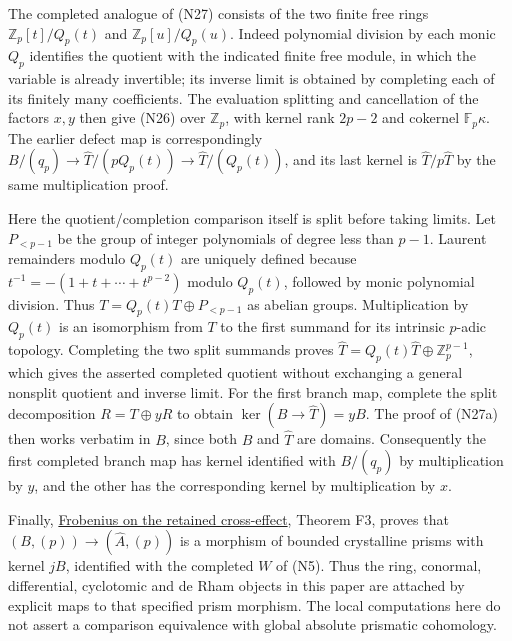\documentclass[
]{article}
\begin{document}
The completed analogue of (N27) consists of the two finite free rings
\(\mathbb Z_p[t]/Q_p(t)\) and \(\mathbb Z_p[u]/Q_p(u)\). Indeed
polynomial division by each monic \(Q_p\) identifies the quotient with
the indicated finite free module, in which the variable is already
invertible; its inverse limit is obtained by completing each of its
finitely many coefficients. The evaluation splitting and cancellation of
the factors \(x,y\) then give (N26) over \(\mathbb Z_p\), with kernel
rank \(2p-2\) and cokernel \(\mathbb F_p\kappa\). The earlier defect map
is correspondingly
\(B/(q_p)\to\widehat T/(pQ_p(t))\to\widehat T/(Q_p(t))\), and its last
kernel is \(\widehat T/p\widehat T\) by the same multiplication proof.

Here the quotient/completion comparison itself is split before taking
limits. Let \(P_{<p-1}\) be the group of integer polynomials of degree
less than \(p-1\). Laurent remainders modulo \(Q_p(t)\) are uniquely
defined because \(t^{-1}=-(1+t+\cdots+t^{p-2})\) modulo \(Q_p(t)\),
followed by monic polynomial division. Thus \(T=Q_p(t)T\oplus P_{<p-1}\)
as abelian groups. Multiplication by \(Q_p(t)\) is an isomorphism from
\(T\) to the first summand for its intrinsic \(p\)-adic topology.
Completing the two split summands proves
\(\widehat T=Q_p(t)\widehat T\oplus\mathbb Z_p^{p-1}\), which gives the
asserted completed quotient without exchanging a general nonsplit
quotient and inverse limit. For the first branch map, complete the split
decomposition \(R=T\oplus yR\) to obtain \(\ker(B\to\widehat T)=yB\).
The proof of (N27a) then works verbatim in \(B\), since both \(B\) and
\(\widehat T\) are domains. Consequently the first completed branch map
has kernel identified with \(B/(q_p)\) by multiplication by \(y\), and
the other has the corresponding kernel by multiplication by \(x\).

Finally,
\href{https://github.com/KokunoYumeto/zeta-function-research-reader/blob/6af54ea3c8ef99127af327f3103e086c68d482c2/workbenches/splitzero-tandem/branches/identity-absorber-square/FROBENIUS_CROSS_EFFECT.md}{Frobenius
on the retained cross-effect}, Theorem F3, proves that
\((B,(p))\to(\widehat A,(p))\) is a morphism of bounded crystalline
prisms with kernel \(jB\), identified with the completed \(W\) of (N5).
Thus the ring, conormal, differential, cyclotomic and de Rham objects in
this paper are attached by explicit maps to that specified prism
morphism. The local computations here do not assert a comparison
equivalence with global absolute prismatic cohomology.
\end{document}
